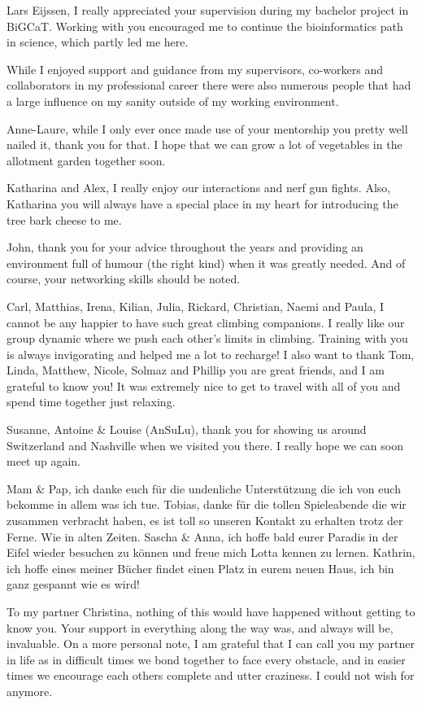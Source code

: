 \documentclass[12pt,openany]{book}
\begin{document}
Lars Eijssen, I really appreciated your supervision during my bachelor
project in BiGCaT. Working with you encouraged me to continue the
bioinformatics path in science, which partly led me here.

While I enjoyed support and guidance from my supervisors, co-workers and
collaborators in my professional career there were also numerous people
that had a large influence on my sanity outside of my working
environment.

Anne-Laure, while I only ever once made use of your mentorship you
pretty well nailed it, thank you for that. I hope that we can grow a lot
of vegetables in the allotment garden together soon.

Katharina and Alex, I really enjoy our interactions and nerf gun fights.
Also, Katharina you will always have a special place in my heart for
introducing the tree bark cheese to me.

John, thank you for your advice throughout the years and providing an
environment full of humour (the right kind) when it was greatly needed.
And of course, your networking skills should be noted.

Carl, Matthias, Irena, Kilian, Julia, Rickard, Christian, Naemi and
Paula, I cannot be any happier to have such great climbing companions. I
really like our group dynamic where we push each other's limits in
climbing. Training with you is always invigorating and helped me a lot
to recharge! I also want to thank Tom, Linda, Matthew, Nicole, Solmaz
and Phillip you are great friends, and I am grateful to know you! It was
extremely nice to get to travel with all of you and spend time together
just relaxing.

Susanne, Antoine \& Louise (AnSuLu), thank you for showing us around
Switzerland and Nashville when we visited you there. I really hope we
can soon meet up again.

Mam \& Pap, ich danke euch für die undenliche Unterstützung die ich von
euch bekomme in allem was ich tue. Tobias, danke für die tollen
Spieleabende die wir zusammen verbracht haben, es ist toll so unseren
Kontakt zu erhalten trotz der Ferne. Wie in alten Zeiten. Sascha \&
Anna, ich hoffe bald eurer Paradis in der Eifel wieder besuchen zu
können und freue mich Lotta kennen zu lernen. Kathrin, ich hoffe eines
meiner Bücher findet einen Platz in eurem neuen Haus, ich bin ganz
gespannt wie es wird!

To my partner Christina, nothing of this would have happened without
getting to know you. Your support in everything along the way was, and
always will be, invaluable. On a more personal note, I am grateful that
I can call you my partner in life as in difficult times we bond together
to face every obstacle, and in easier times we encourage each others
complete and utter craziness. I could not wish for anymore.
\end{document}
